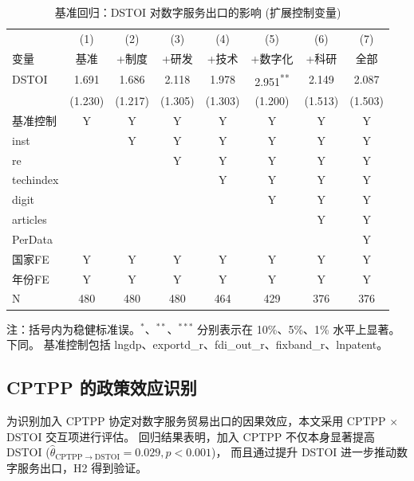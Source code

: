 \documentclass[11pt,a4paper]{article}
\begin{document}
\begin{table}[H]
\centering\small
\caption{基准回归：DSTOI 对数字服务出口的影响 (扩展控制变量)}\label{tab:baseline}
\begin{threeparttable}
\begin{tabular}{lccccccc}
\toprule
 & (1) & (2) & (3) & (4) & (5) & (6) & (7) \\
变量 & 基准 & +制度 & +研发 & +技术 & +数字化 & +科研 & 全部 \\
\midrule
DSTOI & 1.691 & 1.686 & 2.118 & 1.978 & 2.951\textsuperscript{**} & 2.149 & 2.087 \\
      & (1.230) & (1.217) & (1.305) & (1.303) & (1.200) & (1.513) & (1.503) \\
\midrule
基准控制     & Y & Y & Y & Y & Y & Y & Y \\
inst         &   & Y & Y & Y & Y & Y & Y \\
re           &   &   & Y & Y & Y & Y & Y \\
techindex    &   &   &   & Y & Y & Y & Y \\
digit        &   &   &   &   & Y & Y & Y \\
articles     &   &   &   &   &   & Y & Y \\
PerData      &   &   &   &   &   &   & Y \\
国家FE       & Y & Y & Y & Y & Y & Y & Y \\
年份FE       & Y & Y & Y & Y & Y & Y & Y \\
N            & 480 & 480 & 480 & 464 & 429 & 376 & 376 \\
\bottomrule
\end{tabular}
\begin{tablenotes}\footnotesize
\item 注：括号内为稳健标准误。$^{*}$、$^{**}$、$^{***}$ 分别表示在 10\%、5\%、1\% 水平上显著。下同。
基准控制包括 lngdp、exportd\_r、fdi\_out\_r、fixband\_r、lnpatent。
\end{tablenotes}
\end{threeparttable}
\end{table}

\subsection{CPTPP 的政策效应识别}

为识别加入 CPTPP 协定对数字服务贸易出口的因果效应，本文采用 CPTPP $\times$ DSTOI 交互项进行评估。
回归结果表明，加入 CPTPP 不仅本身显著提高 DSTOI ($\hat\theta_{\mathrm{CPTPP}\to\mathrm{DSTOI}} = 0.029, p<0.001$)，
而且通过提升 DSTOI 进一步推动数字服务出口，H2 得到验证。
\end{document}
